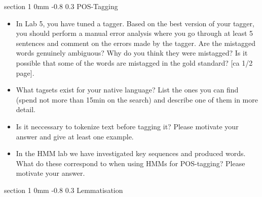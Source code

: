\documentclass[11pt]{article}
\makeatletter
\newcommand{\newsec}[1]{\section{#1}\noindent}
\renewcommand{\section}{\@startsection
{section}%
{1}%
{0mm}%
{-0.8\baselineskip}%
{0.3\baselineskip}%
{\bfseries\large}}%
\makeatother
\begin{document}
\newsec{POS-Tagging}%
\begin{itemize}
\item In Lab 5, you have tuned a tagger. Based on the best version of
  your tagger, you should perform a manual error analysis where you go
  through at least 5 sentences and comment on the errors made by the
  tagger. Are the mistagged words genuinely ambiguous? Why do you
  think they were mistagged? Is it possible that some of the words are
  mistagged in the gold standard? \textcolor{UUred}{[ca 1/2 page]}.
\item What tagsets exist for your native language? List the ones you
  can find (spend not more than 15min on the search) and describe one
  of them in more detail.%
\item Is it neccessary to tokenize text before tagging it? Please
  motivate your answer and give at least one
  example.%
\item In the HMM lab we have investigated key sequences and produced
  words. What do these correspond to when using HMMs for POS-tagging?
  Please motivate your answer. %
\end{itemize}


\newsec{Lemmatisation}%
\end{document}
